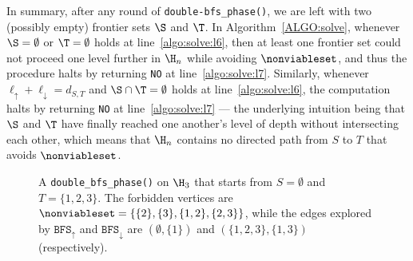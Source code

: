 In summary, after any round of \texttt{double-bfs\_phase()}, we are left with two (possibly empty) frontier sets $\S$ and $\T$.
In Algorithm~\ref{ALGO:solve}, whenever $\S=\emptyset$ or $\T=\emptyset$ holds at line~\ref{algo:solve:l6},
then at least one frontier set could not proceed one level further in $\H_n$ while avoiding $\nonviableset$,
and thus the procedure halts by returning \texttt{NO} at line~\ref{algo:solve:l7}.
Similarly, whenever $\ell_\uparrow+\ell_\downarrow = d_{S,T}$ and $\S\cap\T=\emptyset$ holds at line~\ref{algo:solve:l6},
the computation halts by returning \texttt{NO} at line~\ref{algo:solve:l7} --- the underlying intuition being that
$\S$ and $\T$ have finally reached one another's level of depth without intersecting each other,
which means that $\H_n$ contains no directed path from $S$ to $T$ that avoids $\nonviableset$.

\begin{figure}[htbp]
\centering
{}
\caption{A \texttt{double\_bfs\_phase()} on $\H_3$ that starts from $S=\emptyset$ and $T=\{1,2,3\}$.
The forbidden vertices are $\nonviableset=\{\{2\}, \{3\}, \{1,2\}, \{2, 3\}\}$,
 while the edges explored by $\texttt{BFS}_{\uparrow}$ and
$\texttt{BFS}_{\downarrow}$ are $(\emptyset, \{1\})$ and $(\{1,2,3\}, \{1,3\})$ (respectively).}\label{fig:double_bfs_phase}
\end{figure}

